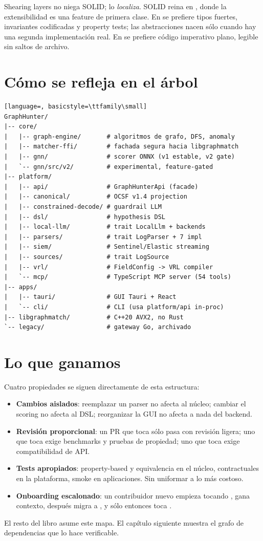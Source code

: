 Shearing layers no niega SOLID; lo \emph{localiza}. SOLID reina en
, donde la extensibilidad es una feature de
primera clase. En  se prefiere tipos fuertes,
invariantes codificadas y property tests; las abstracciones nacen
sólo cuando hay una segunda implementación real. En 
se prefiere código imperativo plano, legible sin
saltos de archivo.

\section{Cómo se refleja en el árbol}

\begin{lstlisting}[language=, basicstyle=\ttfamily\small]
GraphHunter/
|-- core/
|   |-- graph-engine/       # algoritmos de grafo, DFS, anomaly
|   |-- matcher-ffi/        # fachada segura hacia libgraphmatch
|   |-- gnn/                # scorer ONNX (v1 estable, v2 gate)
|   `-- gnn/src/v2/         # experimental, feature-gated
|-- platform/
|   |-- api/                # GraphHunterApi (facade)
|   |-- canonical/          # OCSF v1.4 projection
|   |-- constrained-decode/ # guardrail LLM
|   |-- dsl/                # hypothesis DSL
|   |-- local-llm/          # trait LocalLlm + backends
|   |-- parsers/            # trait LogParser + 7 impl
|   |-- siem/               # Sentinel/Elastic streaming
|   |-- sources/            # trait LogSource
|   |-- vrl/                # FieldConfig -> VRL compiler
|   `-- mcp/                # TypeScript MCP server (54 tools)
|-- apps/
|   |-- tauri/              # GUI Tauri + React
|   `-- cli/                # CLI (usa platform/api in-proc)
|-- libgraphmatch/          # C++20 AVX2, no Rust
`-- legacy/                 # gateway Go, archivado
\end{lstlisting}

\section{Lo que ganamos}

Cuatro propiedades se siguen directamente de esta estructura:

\begin{itemize}
    \item \textbf{Cambios aislados}: reemplazar un parser no afecta
    al núcleo; cambiar el scoring no afecta al DSL; reorganizar la
    GUI no afecta a nada del backend.
    \item \textbf{Revisión proporcional}: un PR que toca sólo
     pasa con revisión ligera; uno que toca
     exige benchmarks y pruebas de propiedad; uno que
    toca  exige compatibilidad de API.
    \item \textbf{Tests apropiados}: property-based y equivalencia
    en el núcleo, contractuales en la plataforma, smoke en
    aplicaciones. Sin uniformar a lo más costoso.
    \item \textbf{Onboarding escalonado}: un contribuidor nuevo
    empieza tocando , gana contexto, después migra a
    , y sólo entonces toca .
\end{itemize}

El resto del libro asume este mapa. El capítulo siguiente muestra
el grafo de dependencias que lo hace verificable.
